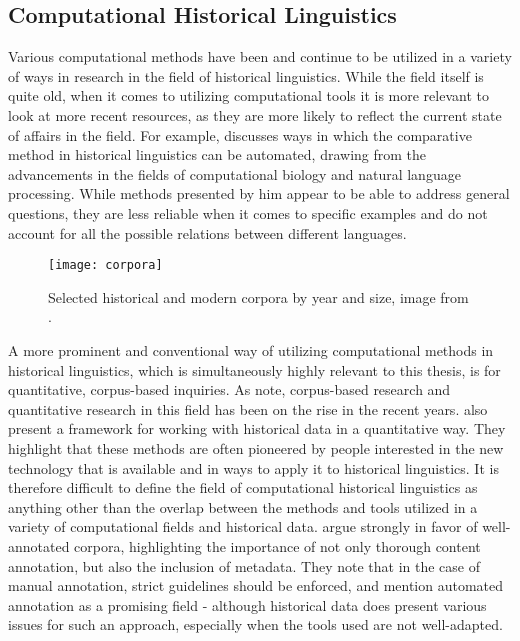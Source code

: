 \subsection{Computational Historical Linguistics}
\label{subsec:comp-hist-ling}

Various computational methods have been and continue to be utilized in a variety of ways in research in the field of historical linguistics. While the field itself is quite old, when it comes to utilizing computational tools it is more relevant to look at more recent resources, as they are more likely to reflect the current state of affairs in the field. For example, \citet{Jäger+2019+151+182} discusses ways in which the comparative method in historical linguistics can be automated, drawing from the advancements in the fields of computational biology and natural language processing. While methods presented by him appear to be able to address general questions, they are less reliable when it comes to specific examples and do not account for all the possible relations between different languages. 

\begin{figure}[h]
\centering
\texttt{[image: corpora]}
\caption{\label{fig:corpora} Selected historical and modern corpora by year and size, image from \citet{quantitative-historical}.}
\end{figure}

A more prominent and conventional way of utilizing computational methods in historical linguistics, which is simultaneously highly relevant to this thesis, is for quantitative, corpus-based inquiries. As \citet{gillivray_2023} note, corpus-based research and quantitative research in this field has been on the rise in the recent years. \citet{quantitative-historical} also present a framework for working with historical data in a quantitative way. They highlight that these methods are often pioneered by people interested in the new technology that is available and in ways to apply it to historical linguistics. It is therefore difficult to define the field of computational historical linguistics as anything other than the overlap between the methods and tools utilized in a variety of computational fields and historical data. \citet{quantitative-historical} argue strongly in favor of well-annotated corpora, highlighting the importance of not only thorough content annotation, but also the inclusion of metadata. They note that in the case of manual annotation, strict guidelines should be enforced, and mention automated annotation as a promising field - although historical data does present various issues for such an approach, especially when the tools used are not well-adapted.

